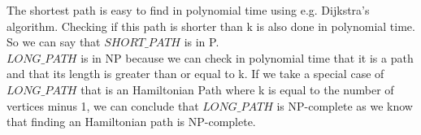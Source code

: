 
The shortest path is easy to find in polynomial time using e.g. Dijkstra's algorithm. Checking if this path is shorter than k is also done in polynomial time. So we can say that $SHORT\_PATH$ is in P.\\

$LONG\_PATH$ is in NP because we can check in polynomial time that it is a path and that its length is greater than or equal to k. If we take a special case of $LONG\_PATH$ that is an Hamiltonian Path where k is equal to the number of vertices minus 1, we can conclude that $LONG\_PATH$ is NP-complete as we know that finding an Hamiltonian path is NP-complete.